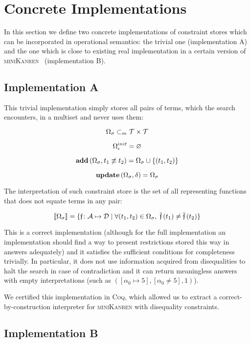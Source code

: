 \section{Concrete Implementations}

In this section we define two concrete implementations of constraint stores which can be incorporated in operational semantics: the trivial one
(implementation A) and the one which is close to existing real implementation in a certain version of \textsc{miniKanren}~\cite{CKanren} (implementation B).

\subsection{Implementation A}

This trivial implementation simply stores all pairs of terms, which the search encounters, in a multiset and never uses them:

\[ \Omega_\sigma \subset_m \mathcal{T} \times \mathcal{T} \]

\[ \Omega_\epsilon^{init} = \varnothing \]

\[ \mathbf{add}\,(\Omega_\sigma, t_1 \not\equiv t_2) = \Omega_\sigma \cup \{(t_1, t_2)\} \]

\[ \mathbf{update}\,(\Omega_\sigma, \delta) = \Omega_\sigma \]

The interpretation of such constraint store is the set of all representing functions that does not equate terms in any pair:

\[ \llbracket{\Omega_\sigma}\rrbracket = \{\mathfrak{f} \colon \mathcal{A}\mapsto\mathcal{D} \mid \forall (t_1, t_2) \in \Omega_\sigma, \; \overline{\mathfrak{f}}\,(t_1) \neq \overline{\mathfrak{f}}\,(t_2)\} \]

This is a correct implementation (although for the full implementation an implementation should find a way to present restrictions stored this way
in answers adequately) and it satisfies the sufficient conditions for completeness trivially. In particular, it does not use information acquired
from disequalities to halt the search in case of contradiction and it can return meaningless answers with empty interpretations
(such as $([\alpha_0 \mapsto 5], [\alpha_0 \neq 5], 1)$).

We certified this implementation in \textsc{Coq}, which allowed us to extract a correct-by-construction interpreter for \textsc{miniKanren} with
disequality constraints.

\subsection{Implementation B}

